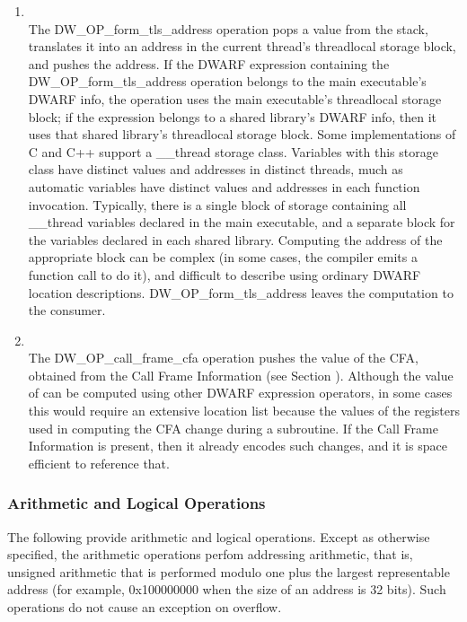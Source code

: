 \begin{enumerate}[1]
\item {} \\
The DW\-\_OP\-\_form\-\_tls\-\_address operation pops a value from the
stack, translates it into an address in the current thread's
thread\dash local storage block, and pushes the address. If the
DWARF expression containing the DW\-\_OP\-\_form\-\_tls\-\_address
operation belongs to the main executable's DWARF info, the
operation uses the main executable's thread\dash local storage
block; if the expression belongs to a shared library's
DWARF info, then it uses that shared library's thread\dash local
storage block.  Some implementations of C and C++ support a
\_\_thread storage class. Variables with this storage class
have distinct values and addresses in distinct threads, much
as automatic variables have distinct values and addresses in
each function invocation. Typically, there is a single block
of storage containing all \_\_thread variables declared in
the main executable, and a separate block for the variables
declared in each shared library. Computing the address of
the appropriate block can be complex (in some cases, the
compiler emits a function call to do it), and difficult
to describe using ordinary DWARF location descriptions.
DW\-\_OP\-\_form\-\_tls\-\_address leaves the computation to the
consumer.

\item {} \\
The DW\-\_OP\-\_call\-\_frame\-\_cfa operation pushes the value of the
CFA, obtained from the Call Frame Information 
(see Section ).
Although the value of 
can be computed using other DWARF expression operators,
in some cases this would require an extensive location list
because the values of the registers used in computing the
CFA change during a subroutine. If the 
Call Frame Information 
is present, then it already encodes such changes, and it is
space efficient to reference that.
\end{enumerate}

\subsubsection{Arithmetic and Logical Operations}
The following provide arithmetic and logical operations. Except
as otherwise specified, the arithmetic operations perfom
addressing arithmetic, that is, unsigned arithmetic that is
performed modulo one plus the largest representable address
(for example, 0x100000000 when the size of an address is 32
bits). Such operations do not cause an exception on overflow.

